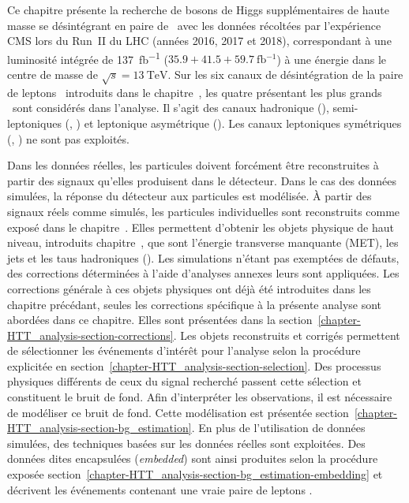 Ce chapitre présente la
recherche de bosons de Higgs supplémentaires de haute masse se désintégrant en paire de \tau\
avec les données récoltées par l'expérience CMS
lors du Run~II du LHC (années 2016, 2017 et 2018),
correspondant à une luminosité intégrée de \SI{137}{\femto\barn^{-1}} ($\num{35.9}+\num{41.5}+\SI{59.7}{\femto\barn^{-1}}$)
à une énergie dans le centre de masse de $\sqrt{s}=\SI{13}{\TeV}$.
Sur les six canaux de désintégration de la paire de leptons \tau\ introduits dans le chapitre~,
les quatre présentant les plus grands \BR\ sont considérés dans l'analyse.
Il s'agit des canaux
hadronique (\tauh\tauh),
semi-leptoniques (\mu\tauh, \ele\tauh)
et
leptonique asymétrique (\ele\mu).
Les canaux leptoniques symétriques (\mu\mu, \ele\ele) ne sont pas exploités.
\par
Dans les données réelles, les particules doivent forcément être reconstruites à partir des signaux qu'elles produisent dans le détecteur.
Dans le cas des données simulées, la réponse du détecteur aux particules est modélisée.
À partir des signaux réels comme simulés, les particules individuelles sont reconstruits comme exposé dans le chapitre~.
Elles permettent d'obtenir les objets physique de haut niveau, introduits chapitre~\refChHLO, que sont l'énergie transverse manquante (MET), les jets et les taus hadroniques (\tauh).
Les simulations n'étant pas exemptées de défauts, des corrections déterminées à l'aide d'analyses annexes leurs sont appliquées.
Les corrections générale à ces objets physiques ont déjà été introduites dans les chapitre précédant, seules les corrections spécifique à la présente analyse sont abordées dans ce chapitre.
Elles sont présentées dans la section~\ref{chapter-HTT_analysis-section-corrections}.
Les objets reconstruits et corrigés permettent de sélectionner les événements d'intérêt pour l'analyse selon la procédure explicitée en section~\ref{chapter-HTT_analysis-section-selection}.
Des processus physiques différents de ceux du signal recherché passent cette sélection et constituent le bruit de fond.
Afin d'interpréter les observations, il est nécessaire de modéliser ce bruit de fond.
Cette modélisation est présentée section~\ref{chapter-HTT_analysis-section-bg_estimation}.
En plus de l'utilisation de données simulées, des techniques basées sur les données réelles sont exploitées.
Des données dites \og encapsulées \fg{} (\emph{embedded}) sont ainsi produites selon la procédure exposée section~\ref{chapter-HTT_analysis-section-bg_estimation-embedding} et décrivent les événements contenant une vraie paire de leptons \tau.
